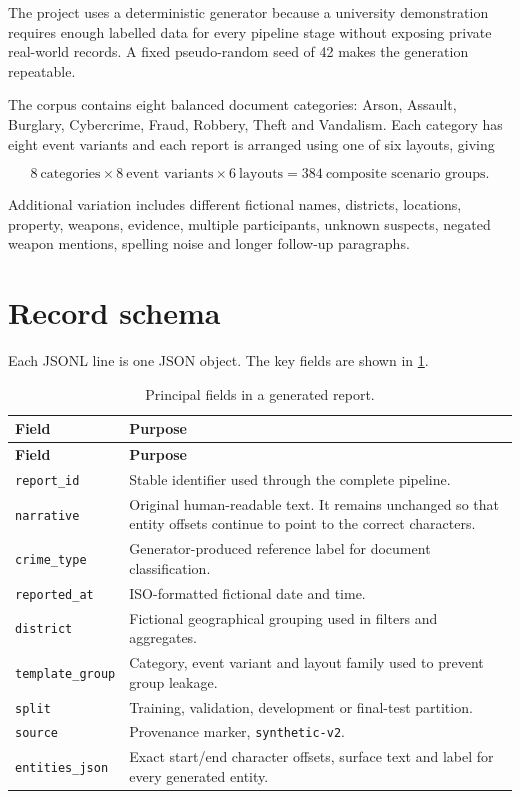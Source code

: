 \documentclass[12pt,a4paper]{report}
\newcommand{\code}[1]{\texttt{#1}}
\begin{document}
The project uses a deterministic generator because a university demonstration requires enough labelled data for every pipeline stage without exposing private real-world records. A fixed pseudo-random seed of 42 makes the generation repeatable.

The corpus contains eight balanced document categories: Arson, Assault, Burglary, Cybercrime, Fraud, Robbery, Theft and Vandalism. Each category has eight event variants and each report is arranged using one of six layouts, giving

\begin{equation}
8\ \text{categories} \times 8\ \text{event variants} \times 6\ \text{layouts}
=384\ \text{composite scenario groups}.
\end{equation}

Additional variation includes different fictional names, districts, locations, property, weapons, evidence, multiple participants, unknown suspects, negated weapon mentions, spelling noise and longer follow-up paragraphs.

\section{Record schema}

Each JSONL line is one JSON object. The key fields are shown in \cref{tab:schema}.

\begin{longtable}{p{}p{}}
\caption{Principal fields in a generated report.}\label{tab:schema}\\
\toprule
\textbf{Field} & \textbf{Purpose} \\
\midrule
\endfirsthead
\toprule
\textbf{Field} & \textbf{Purpose} \\
\midrule
\endhead
\code{report\_id} & Stable identifier used through the complete pipeline. \\
\code{narrative} & Original human-readable text. It remains unchanged so that entity offsets continue to point to the correct characters. \\
\code{crime\_type} & Generator-produced reference label for document classification. \\
\code{reported\_at} & ISO-formatted fictional date and time. \\
\code{district} & Fictional geographical grouping used in filters and aggregates. \\
\code{template\_group} & Category, event variant and layout family used to prevent group leakage. \\
\code{split} & Training, validation, development or final-test partition. \\
\code{source} & Provenance marker, \code{synthetic-v2}. \\
\code{entities\_json} & Exact start/end character offsets, surface text and label for every generated entity. \\
\bottomrule
\end{longtable}
\end{document}

